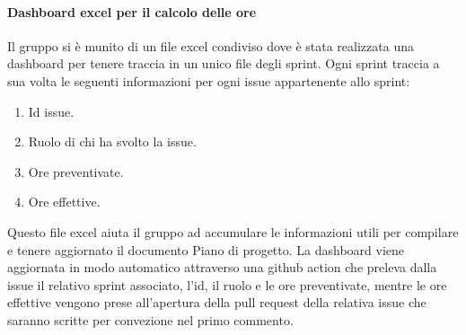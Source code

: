\paragraph{Dashboard excel per il calcolo delle ore}
Il gruppo si è munito di un file excel condiviso dove è stata realizzata una dashboard per tenere traccia in un unico file degli sprint. Ogni sprint traccia a sua volta le seguenti informazioni per ogni issue appartenente allo sprint:
\begin{enumerate}
    \item Id issue.
    \item Ruolo di chi ha svolto la issue.
    \item Ore preventivate.
    \item Ore effettive.
\end{enumerate}
Questo file excel aiuta il gruppo ad accumulare le informazioni utili per compilare e tenere aggiornato il documento Piano di progetto.
La dashboard viene aggiornata in modo automatico attraverso una github action che preleva dalla issue il relativo sprint associato, l’id,
 il ruolo e le ore preventivate, mentre le ore effettive vengono prese all'apertura della pull request della relativa issue che saranno scritte per convezione nel primo commento.

